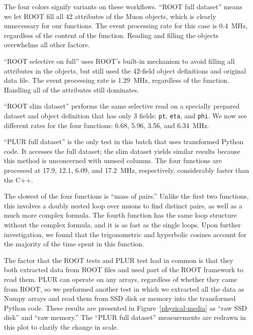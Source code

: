 \documentclass[10pt, conference, compsocconf]{IEEEtran}
\begin{document}
The four colors signify variants on these workflows. ``ROOT full dataset'' means we let ROOT fill all 42 attributes of the Muon objects, which is clearly unnecessary for our functions. The event processing rate for this case is 0.4~MHz, regardless of the content of the function. Reading and filling the objects overwhelms all other factors.

``ROOT selective on full'' uses ROOT's built-in mechanism to avoid filling all attributes in the objects, but still used the 42-field object definitions and original data file. The event processing rate is 1.29~MHz, regardless of the function. Handling all of the attributes still dominates.

``ROOT slim dataset'' performs the same selective read on a specially prepared dataset and object definition that has only 3 fields: {\tt pt}, {\tt eta}, and {\tt phi}. We now see different rates for the four functions: 6.68, 5.96, 3.56, and 6.34~MHz.

``PLUR full dataset'' is the only test in this batch that uses transformed Python code. It accesses the full dataset; the slim dataset yields similar results because this method is unconcerned with unused columns. The four functions are processed at 17.9, 12.1, 6.09, and 17.2~MHz, respectively, considerably faster than the C++.

The slowest of the four functions is ``mass of pairs.'' Unlike the first two functions, this involves a doubly nested loop over muons to find distinct pairs, as well as a much more complex formula. The fourth function has the same loop structure without the complex formula, and it is as fast as the single loops. Upon further investigation, we found that the trigonometric and hyperbolic cosines account for the majority of the time spent in this function.

The factor that the ROOT tests and PLUR test had in common is that they both extracted data from ROOT files and used part of the ROOT framework to read them. PLUR can operate on any arrays, regardless of whether they came from ROOT, so we performed another test in which we extracted all the data as Numpy arrays and read them from SSD disk or memory into the transformed Python code. These results are presented in Figure~\ref{physical-media} as ``raw SSD disk'' and ``raw memory.'' The ``PLUR full dataset'' measurements are redrawn in this plot to clarify the change in scale.
\end{document}
